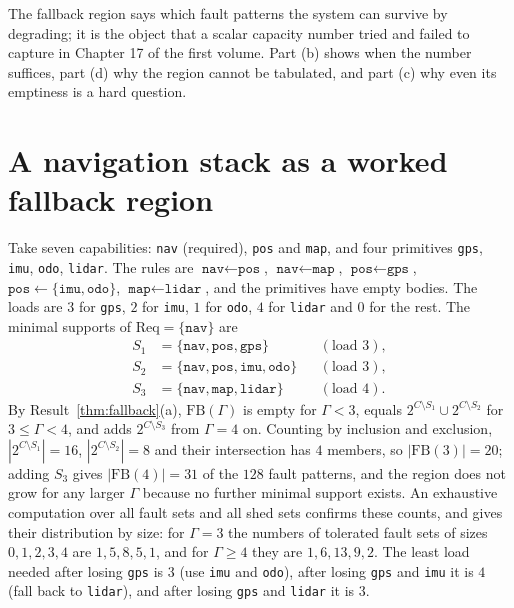 The fallback region says which fault patterns the system can survive by degrading; it is the object that a scalar capacity number tried and failed to capture in Chapter 17 of the first volume. Part (b) shows when the number suffices, part (d) why the region cannot be tabulated, and part (c) why even its emptiness is a hard question.


\section{A navigation stack as a worked fallback region}\label{sec:nav-stack}

Take seven capabilities: \texttt{nav} (required), \texttt{pos} and \texttt{map}, and four primitives \texttt{gps}, \texttt{imu}, \texttt{odo}, \texttt{lidar}. The rules are $\texttt{nav}\leftarrow\texttt{pos}$, $\texttt{nav}\leftarrow\texttt{map}$, $\texttt{pos}\leftarrow\texttt{gps}$, $\texttt{pos}\leftarrow\{\texttt{imu},\texttt{odo}\}$, $\texttt{map}\leftarrow\texttt{lidar}$, and the primitives have empty bodies. The loads are $3$ for \texttt{gps}, $2$ for \texttt{imu}, $1$ for \texttt{odo}, $4$ for \texttt{lidar} and $0$ for the rest. The minimal supports of $\mathrm{Req}=\{\texttt{nav}\}$ are
\begin{align*}
S_1&=\{\texttt{nav},\texttt{pos},\texttt{gps}\} &&(\text{load }3),\\
S_2&=\{\texttt{nav},\texttt{pos},\texttt{imu},\texttt{odo}\} &&(\text{load }3),\\
S_3&=\{\texttt{nav},\texttt{map},\texttt{lidar}\} &&(\text{load }4).
\end{align*}
By Result~\ref{thm:fallback}(a), $\mathrm{FB}(\Gamma)$ is empty for $\Gamma<3$, equals $2^{C\setminus S_1}\cup2^{C\setminus S_2}$ for $3\le\Gamma<4$, and adds $2^{C\setminus S_3}$ from $\Gamma=4$ on. Counting by inclusion and exclusion, $|2^{C\setminus S_1}|=16$, $|2^{C\setminus S_2}|=8$ and their intersection has $4$ members, so $|\mathrm{FB}(3)|=20$; adding $S_3$ gives $|\mathrm{FB}(4)|=31$ of the $128$ fault patterns, and the region does not grow for any larger $\Gamma$ because no further minimal support exists. An exhaustive computation over all fault sets and all shed sets confirms these counts, and gives their distribution by size: for $\Gamma=3$ the numbers of tolerated fault sets of sizes $0,1,2,3,4$ are $1,5,8,5,1$, and for $\Gamma\ge4$ they are $1,6,13,9,2$. The least load needed after losing \texttt{gps} is $3$ (use \texttt{imu} and \texttt{odo}), after losing \texttt{gps} and \texttt{imu} it is $4$ (fall back to \texttt{lidar}), and after losing \texttt{gps} and \texttt{lidar} it is $3$.

